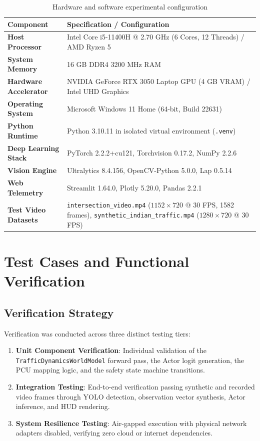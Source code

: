 \begin{table}[htbp]
\centering
\small
\caption{Hardware and software experimental configuration}
\label{tab:ch4_hardware_setup}
\begin{tabularx}{\textwidth}{|p{4.2cm}|X|}
\hline
\textbf{Component} & \textbf{Specification / Configuration} \\ \hline
\textbf{Host Processor} & Intel Core i5-11400H @ 2.70 GHz (6 Cores, 12 Threads) / AMD Ryzen 5 \\ \hline
\textbf{System Memory} & 16 GB DDR4 3200 MHz RAM \\ \hline
\textbf{Hardware Accelerator} & NVIDIA GeForce RTX 3050 Laptop GPU (4 GB VRAM) / Intel UHD Graphics \\ \hline
\textbf{Operating System} & Microsoft Windows 11 Home (64-bit, Build 22631) \\ \hline
\textbf{Python Runtime} & Python 3.10.11 in isolated virtual environment (\texttt{.venv}) \\ \hline
\textbf{Deep Learning Stack} & PyTorch 2.2.2+cu121, Torchvision 0.17.2, NumPy 2.2.6 \\ \hline
\textbf{Vision Engine} & Ultralytics 8.4.156, OpenCV-Python 5.0.0, Lap 0.5.14 \\ \hline
\textbf{Web Telemetry} & Streamlit 1.64.0, Plotly 5.20.0, Pandas 2.2.1 \\ \hline
\textbf{Test Video Datasets} & \texttt{intersection\_video.mp4} ($1152 \times 720$ @ 30 FPS, 1582 frames), \texttt{synthetic\_indian\_traffic.mp4} ($1280 \times 720$ @ 30 FPS) \\ \hline
\end{tabularx}
\end{table}

\section{Test Cases and Functional Verification}
\label{sec:ch4_test_cases}

\subsection{Verification Strategy}
Verification was conducted across three distinct testing tiers:
\begin{enumerate}
    \item \textbf{Unit Component Verification}: Individual validation of the \texttt{TrafficDynamicsWorldModel} forward pass, the Actor logit generation, the PCU mapping logic, and the safety state machine transitions.
    \item \textbf{Integration Testing}: End-to-end verification passing synthetic and recorded video frames through YOLO detection, observation vector synthesis, Actor inference, and HUD rendering.
    \item \textbf{System Resilience Testing}: Air-gapped execution with physical network adapters disabled, verifying zero cloud or internet dependencies.
\end{enumerate}

